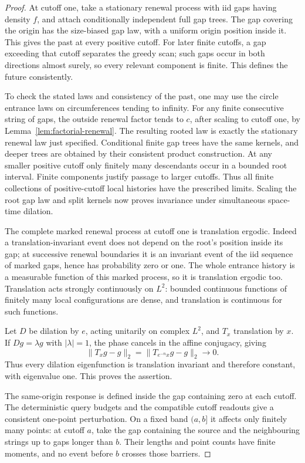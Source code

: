 \documentclass[11pt,letterpaper]{article}
\begin{document}
\begin{proof}
At cutoff one, take a stationary renewal process with iid gaps
having density $f$, and attach conditionally independent full gap
trees. The gap covering the origin has the size-biased gap law,
with a uniform origin position inside it. This gives the past at
every positive cutoff. For later finite cutoffs, a gap exceeding
that cutoff separates the greedy scan; such gaps occur in both
directions almost surely, so every relevant component is finite.
This defines the future consistently.

To check the stated laws and consistency of the past, one may use
the circle entrance laws on circumferences tending to infinity.
For any finite consecutive string of gaps, the outside renewal
factor tends to $c$, after scaling to cutoff one, by
Lemma~\ref{lem:factorial-renewal}. The resulting rooted law is
exactly the stationary renewal law just specified. Conditional
finite gap trees have the same kernels, and deeper trees are
obtained by their consistent product construction. At any smaller
positive cutoff only finitely many descendants occur in a bounded
root interval. Finite components justify passage to larger cutoffs.
Thus all finite collections of positive-cutoff local histories have
the prescribed limits. Scaling the root gap law and split kernels
now proves invariance under simultaneous space-time dilation.

The complete marked renewal process at cutoff one is translation
ergodic. Indeed a translation-invariant event does not depend on
the root's position inside its gap; at successive renewal boundaries
it is an invariant event of the iid sequence of marked gaps, hence
has probability zero or one. The whole entrance history is a
measurable function of this marked process, so it is translation
ergodic too. Translation acts strongly continuously on $L^2$:
bounded continuous functions of finitely many local configurations
are dense, and translation is continuous for such functions.

Let $D$ be dilation by $e$, acting unitarily on complex $L^2$, and
$T_x$ translation by $x$. If $Dg=\lambda g$ with $|\lambda|=1$,
the phase cancels in the affine conjugacy, giving
\[
 \|T_xg-g\|_2=\|T_{e^{-n}x}g-g\|_2\longrightarrow0.
\]
Thus every dilation eigenfunction is translation invariant and
therefore constant, with eigenvalue one. This proves the assertion.

The same-origin response is defined inside the gap containing zero
at each cutoff. The deterministic query budgets and the compatible
cutoff readouts give a consistent one-point perturbation. On a
fixed band $(a,b]$ it affects only finitely many points: at cutoff
$a$, take the gap containing the source and the neighbouring strings
up to gaps longer than $b$. Their lengths and point counts have
finite moments, and no event before $b$ crosses those barriers.


\end{proof}
\end{document}
